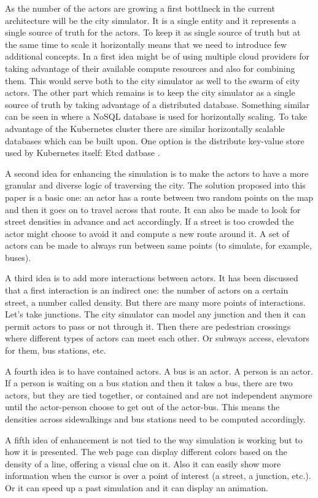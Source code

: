 \documentclass[conference]{IEEEtran}
\begin{document}
As the number of the actors are growing a first bottlneck in the current architecture will be the city simulator. It is a single entity and it represents a single source of truth for the actors. To keep it as single source of truth but at the same time to scale it horizontally means that we need to introduce few additional concepts. In \cite{6847479} a first idea might be of using multiple cloud providers for taking advantage of their available compute resources and also for combining them. This would serve both to the city simulator as well to the swarm of city actors. The other part which remains is to keep the city simulator as a single source of truth by taking advantage of a distributed database. Something similar can be seen in \cite{8509417} where a NoSQL database is used for horizontally scaling. To take advantage of the Kubernetes cluster there are similar horizontally scalable databases which can be built upon. One option is the distribute key-value store used by Kubernetes itself: Etcd datbase \cite{etcd}.

A second idea for enhancing the simulation is to make the actors to have a more granular and diverse logic of traversing the city. The solution proposed into this paper is a basic one: an actor has a route between two random points on the map and then it goes on to travel across that route. It can also be made to look for street densities in advance and act accordingly. If a street is too crowded the actor might choose to avoid it and compute a new route around it. A set of actors can be made to always run between same points (to simulate, for example, buses).

A third idea is to add more interactions between actors. It has been discussed that a first interaction is an indirect one: the number of actors on a certain street, a number called density. But there are many more points of interactions. Let's take junctions. The city simulator can model any junction and then it can permit actors to pass or not through it. Then there are pedestrian crossings where different types of actors can meet each other. Or subways access, elevators for them, bus stations, etc.

A fourth idea is to have contained actors. A bus is an actor. A person is an actor. If a person is waiting on a bus station and then it takes a bus, there are two actors, but they are tied together, or contained and are not independent anymore until the actor-person choose to get out of the actor-bus. This means the densities across sidewalkings and bus stations need to be computed accordingly.

A fifth idea of enhancement is not tied to the way simulation is working but to how it is presented. The web page can display different colors based on the density of a line, offering a visual clue on it. Also it can easily show more information when the cursor is over a point of interest (a street, a junction, etc.). Or it can speed up a past simulation and it can display an animation.




\vspace{12pt}
\end{document}

